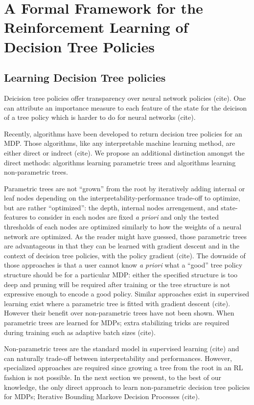 \chapter{A Formal Framework for the Reinforcement Learning of Decision Tree Policies}
\section{Learning Decision Tree policies}
Deicision tree policies offer transparency over neural network policies (cite). 
One can attribute an importance measure to each feature of the state for the deicison of a tree policy which is harder to do for neural networks (cite).

Recently, algorithms have been developed to return decision tree policies for an MDP.
Those algorithms, like any interpretable machine learning method, are either direct or indrect (cite).
We propose an additional distinction amongst the direct methods: algorithms learning parametric trees and algorithms learning non-parametric trees.

Parametric trees are not ``grown'' from the root by iteratively adding internal or leaf nodes depending on the interpretability-performance trade-off to optimize, but are rather ``optimized'': the depth, internal nodes arrengement, and state-features to consider in each nodes are fixed \textit{a priori} and only the tested thresholds of each nodes are optimized similarly to how the weights of a neural network are optimized.
As the reader might have guessed, those parametric trees are advantageous in that they can be learned with gradient descent and in the context of decision tree policies, with the policy gradient (cite).
The downside of those approaches is that a user cannot know \textit{a priori}  what a ``good'' tree policy structure should be for a particular MDP: either the specified structure is too deep and pruning will be required after training or the tree structure is not expressive enough to encode a good policy. 
Similar approaches exist in supervised learning exist where a parametric tree is fitted with gradient descent (cite). However their benefit over non-parametric trees have not been shown.
When parametric trees are learned for MDPs; extra stabilizing tricks are required during training such as adaptive batch sizes (cite).

Non-parametric trees are the standard model in supervised learning (cite) and can naturally trade-off between interpretability and performances. However, specialized approaches are required since growing a tree from the root in an RL fashion is not possible.
In the next section we present, to the best of our knowledge, the only direct approach to learn non-parametric decision tree policies for MDPs; Iterative Bounding Markove Decision Processes (cite). 

